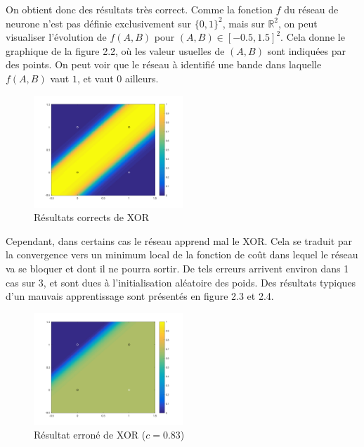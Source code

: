 On obtient donc des résultats très correct. Comme la fonction $f$ du réseau de neurone n'est pas définie exclusivement sur $\{0, 1\}^2$, mais sur $\mathbb{R}^2$, on peut visualiser l'évolution de $f(A, B)$ pour $(A, B) \in [-0.5, 1.5]^2$. Cela donne le graphique de la figure 2.2, où les valeur usuelles de $(A, B)$ sont indiquées par des points. On peut voir que le réseau à identifié une bande dans laquelle $f(A, B)$ vaut $1$, et vaut $0$ ailleurs.

\begin{figure}[!ht]
\begin{center}
  \includegraphics[width=0.5\textwidth]{images/xor1.png}
\end{center}
\caption{Résultats corrects de XOR}
\end{figure}

Cependant, dans certains cas le réseau apprend mal le XOR. Cela se traduit par la convergence vers un minimum local de la fonction de coût dans lequel le réseau va se bloquer et dont il ne pourra sortir. De tels erreurs arrivent environ dans 1 cas sur 3, et sont dues à l'initialisation aléatoire des poids. Des résultats typiques d'un mauvais apprentissage sont présentés en figure 2.3 et 2.4.

\begin{figure}[!ht]
\begin{center}
  \includegraphics[width=0.5\textwidth]{images/xor2.png}
\end{center}
\caption{Résultat erroné de XOR ($c = 0.83$)}
\end{figure}

